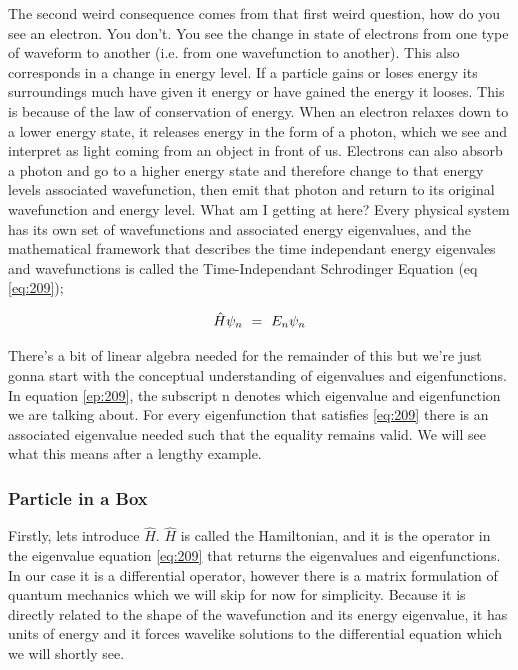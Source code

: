 \documentclass{article}
\begin{document}
The second weird consequence comes from that first weird question, how do you see an electron. You don't. You see the change in state of electrons from one type of waveform to another (i.e. from one wavefunction to another). This also corresponds in a change in energy level. If a particle gains or loses energy its surroundings much have given it energy or have gained the energy it looses. This is because of the law of conservation of energy. When an electron relaxes down to a lower energy state, it releases energy in the form of a photon, which we see and interpret as light coming from an object in front of us. Electrons can also absorb a photon and go to a higher energy state and therefore change to that energy levels associated wavefunction, then emit that photon and return to its original wavefunction and energy level. What am I getting at here? Every physical system has its own set of wavefunctions and associated energy eigenvalues, and the mathematical framework that describes the time independant energy eigenvales and wavefunctions is called the Time-Independant Schrodinger Equation (eq \ref{eq:209});

\begin{equation} \label{eq:209}
\hat{H}\psi_n \hspace{0.125cm} = \hspace{0.125cm} E_n\psi_n
\end{equation}

There's a bit of linear algebra needed for the remainder of this but we're just gonna start with the conceptual understanding of eigenvalues and eigenfunctions. In equation \ref{ep:209}, the subscript n denotes which eigenvalue and eigenfunction we are talking about. For every eigenfunction that satisfies \ref{eq:209} there is an associated eigenvalue needed such that the equality remains valid. We will see what this means after a lengthy example. 

\subsubsection{Particle in a Box}

Firstly, lets introduce \begin{math} \hat{H} \end{math}. \begin{math} \hat{H} \end{math} is called the Hamiltonian, and it is the operator in the eigenvalue equation \ref{eq:209} that returns the eigenvalues and eigenfunctions. In our case it is a differential operator, however there is a matrix formulation of quantum mechanics which we will skip for now for simplicity. Because it is directly related to the shape of the wavefunction and its energy eigenvalue, it has units of energy and it forces wavelike solutions to the differential equation which we will shortly see. 
\end{document}
